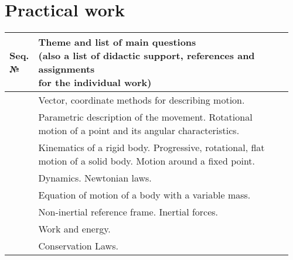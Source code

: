 \documentclass{rnp}
\begin{document}
%
\section{Practical work}
%

\setcounter{magicrownumbers}{0}
\begin{longtable}{|>{\arraybackslash}m{0.06\linewidth}|>{\raggedright\arraybackslash}m{0.9\linewidth}|}
\hline \rowcolor{gray!20}
 \thead{Seq. \\ №} & \thead {Theme and list of main questions \\ (also a list of didactic support, references and assignments \\ for the individual work) } \\ 
\hline
\endhead 
\thead{\rownumber.} 
& Vector, coordinate methods for describing motion.
\newline
\cite[\S~1.1]{IrodovProblems}
\\ 
\hline 
\thead{\rownumber.} 
&  Parametric description of the movement. Rotational motion of a point and its angular characteristics.
\newline
\cite[\S~1.1]{IrodovProblems}
\\ 
\hline 
\thead{\rownumber.} 
& Kinematics of a rigid body. Progressive, rotational, flat motion of a solid body. Motion around a fixed point.
\newline
\cite[\S~1.1]{IrodovProblems}
\\ 
\hline 
\thead{\rownumber.} 
& Dynamics. Newtonian laws.
\newline
\cite[\S~1.2]{IrodovProblems}
\\ 
\hline 
\thead{\rownumber.} 
& Equation of motion of a body with a variable mass.
\newline
\cite[\S~1.3]{IrodovProblems}
\\ 
\hline 
\thead{\rownumber.} 
& Non-inertial reference frame. Inertial forces.
\newline
\cite[\S~1.2]{IrodovProblems}
\\ 
\hline 
\thead{\rownumber.} 
&  Work and energy.
\newline
\cite[\S~1.3]{IrodovProblems}
\\ 
\hline 
\thead{\rownumber.} 
& Conservation Laws.
\newline
\cite[\S~1.3]{IrodovProblems}
\\ 

\end{longtable}
\end{document}
